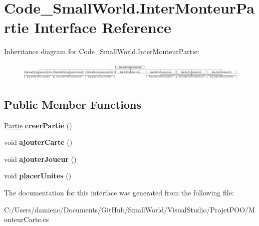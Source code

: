 \hypertarget{interface_code___small_world_1_1_inter_monteur_partie}{\section{Code\-\_\-\-Small\-World.\-Inter\-Monteur\-Partie Interface Reference}
\label{interface_code___small_world_1_1_inter_monteur_partie}
}
Inheritance diagram for Code\-\_\-\-Small\-World.\-Inter\-Monteur\-Partie\-:\begin{figure}[H]
\begin{center}
\leavevmode
\includegraphics[height=0.869565cm]{interface_code___small_world_1_1_inter_monteur_partie}
\end{center}
\end{figure}
\subsection*{Public Member Functions}
\begin{DoxyCompactItemize}
\item 
\hypertarget{interface_code___small_world_1_1_inter_monteur_partie_a8f07e29ce6ab00e90ebc49ab92f795ce}{\hyperlink{interface_code___small_world_1_1_partie}{Partie} {\bfseries creer\-Partie} ()}\label{interface_code___small_world_1_1_inter_monteur_partie_a8f07e29ce6ab00e90ebc49ab92f795ce}

\item 
\hypertarget{interface_code___small_world_1_1_inter_monteur_partie_adae897749a4c19c7d6b545f8157c9235}{void {\bfseries ajouter\-Carte} ()}\label{interface_code___small_world_1_1_inter_monteur_partie_adae897749a4c19c7d6b545f8157c9235}

\item 
\hypertarget{interface_code___small_world_1_1_inter_monteur_partie_a6443110e45d388d55b2cb8e23db2aa1c}{void {\bfseries ajouter\-Joueur} ()}\label{interface_code___small_world_1_1_inter_monteur_partie_a6443110e45d388d55b2cb8e23db2aa1c}

\item 
\hypertarget{interface_code___small_world_1_1_inter_monteur_partie_ae8f34805f85b6c55380b944f67752498}{void {\bfseries placer\-Unites} ()}\label{interface_code___small_world_1_1_inter_monteur_partie_ae8f34805f85b6c55380b944f67752498}

\end{DoxyCompactItemize}


The documentation for this interface was generated from the following file\-:\begin{DoxyCompactItemize}
\item 
C\-:/\-Users/damienc/\-Documents/\-Git\-Hub/\-Small\-World/\-Visual\-Studio/\-Projet\-P\-O\-O/Monteur\-Carte.\-cs\end{DoxyCompactItemize}
